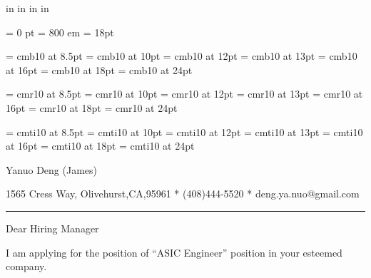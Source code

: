 


 in     %
 in     %
 in  %
 in  %

\nopagenumbers

\parindent = 0 pt
\emergencystretch = 800 em
\baselineskip = 18pt


\font\FFba=      cmb10            at 8.5pt
\font\FFbb=      cmb10            at 10pt
\font\FFbc=      cmb10            at 12pt
\font\FFbd=      cmb10            at 13pt
\font\FFbe=      cmb10            at 16pt
\font\FFbf=      cmb10            at 18pt
\font\FFbg=      cmb10            at 24pt

\font\FFra=      cmr10            at 8.5pt
\font\FFrb=      cmr10            at 10pt
\font\FFrc=      cmr10            at 12pt
\font\FFrd=      cmr10            at 13pt
\font\FFre=      cmr10            at 16pt
\font\FFrf=      cmr10            at 18pt
\font\FFrg=      cmr10            at 24pt

\font\FFta=      cmti10           at 8.5pt
\font\FFtb=      cmti10           at 10pt
\font\FFtc=      cmti10           at 12pt
\font\FFtd=      cmti10           at 13pt
\font\FFte=      cmti10           at 16pt
\font\FFtf=      cmti10           at 18pt
\font\FFtg=      cmti10           at 24pt


\FFrd

{
Yanuo Deng (James)
}

{ 
1565 Cress Way, Olivehurst,CA,95961
*
(408)444-5520
*
deng.ya.nuo@gmail.com
}

{ \smallbreak } 
{\par\noindent\hrule} 
{ \medbreak } { 
}

%
%

{ \bigbreak } 

{ 
Dear Hiring Manager
}

{ \bigbreak } 
I am applying for the position of ``ASIC Engineer'' position in your esteemed company.

